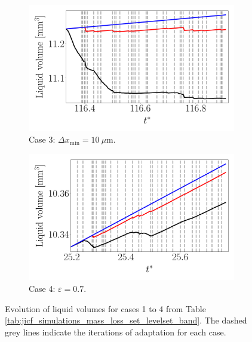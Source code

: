 \begin{figure}[ht]
\begin{subfigure}[b]{0.45\textwidth}
	\flushleft
   \includegraphics[scale=0.24]{./part2_developments/figures_ch5_resolved_JICF/flow_rates_mass_loss_set_levelset_band/vl_loss_case_dx10}
   \caption{Case 3: $\Delta x_\mathrm{min} = 10~\mu$m.}
\end{subfigure}
\hfill
\begin{subfigure}[b]{0.45\textwidth}
	\centering
   \includegraphics[scale=0.24]{./part2_developments/figures_ch5_resolved_JICF/flow_rates_mass_loss_set_levelset_band/vl_loss_case_epsilon}
   \caption{Case 4: $\varepsilon = 0.7$.}
\end{subfigure}


   \caption[Evolution of liquid volumes]{Evolution of liquid volumes for cases 1 to 4 from Table \ref{tab:jicf_simulations_mass_loss_set_levelset_band}. The dashed grey lines indicate the iterations of adaptation for each case.}
\label{fig:JICF_liquid_evolution_loss_due_to_set_levelset_band}
\end{figure}

